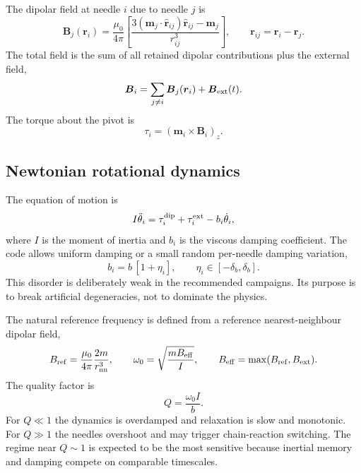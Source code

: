 \documentclass[11pt,a4paper]{article}
\newcommand{\vect}[1]{\boldsymbol{#1}}
\begin{document}
The dipolar field at needle $i$ due to needle $j$ is
\begin{equation}
\vect B_j(\vect r_i)=\frac{\mu_0}{4\pi}\left[
\frac{3(\vect m_j\cdot \hat{\vect r}_{ij})\hat{\vect r}_{ij}-\vect m_j}{r_{ij}^3}
\right],
\qquad
\vect r_{ij}=\vect r_i-\vect r_j.
\end{equation}
The total field is the sum of all retained dipolar contributions plus the external field,
\begin{equation}
\vect B_i=\sum_{j\ne i}\vect B_j(\vect r_i)+\vect B_{\rm ext}(t).
\end{equation}
The torque about the pivot is
\begin{equation}
\tau_i = (\vect m_i\times \vect B_i)_z.
\end{equation}

\subsection{Newtonian rotational dynamics}

The equation of motion is
\begin{equation}
I\ddot\theta_i = \tau_i^{\rm dip}+\tau_i^{\rm ext}-b_i\dot\theta_i,
\label{eq:eom}
\end{equation}
where $I$ is the moment of inertia and $b_i$ is the viscous damping coefficient. The code allows uniform damping or a small random per-needle damping variation,
\begin{equation}
b_i=b\,[1+\eta_i], \qquad \eta_i\in[-\delta_b,\delta_b].
\end{equation}
This disorder is deliberately weak in the recommended campaigns. Its purpose is to break artificial degeneracies, not to dominate the physics.

The natural reference frequency is defined from a reference nearest-neighbour dipolar field,
\begin{equation}
B_{\rm ref}=\frac{\mu_0}{4\pi}\frac{2m}{r_{\rm nn}^3},
\qquad
\omega_0=\sqrt{\frac{mB_{\rm eff}}{I}},
\qquad
B_{\rm eff}=\max(B_{\rm ref},B_{\rm ext}).
\end{equation}
The quality factor is
\begin{equation}
Q=\frac{\omega_0 I}{b}.
\end{equation}
For $Q\ll 1$ the dynamics is overdamped and relaxation is slow and monotonic. For $Q\gg1$ the needles overshoot and may trigger chain-reaction switching. The regime near $Q\sim 1$ is expected to be the most sensitive because inertial memory and damping compete on comparable timescales.
\end{document}
